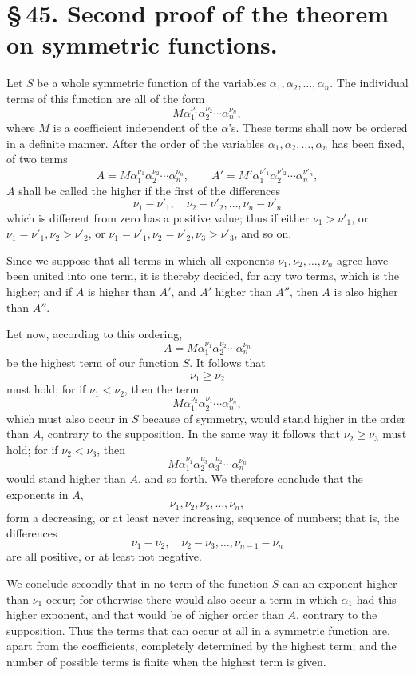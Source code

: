 \documentclass[11pt]{article}
\begin{document}
\section*{\S\,45. Second proof of the theorem on symmetric functions.}

Let \(S\) be a whole symmetric function of the variables \(\alpha_1,\alpha_2,\ldots,\alpha_n\). The individual terms of this function are all of the form
\[
 M\alpha_1^{\nu_1}\alpha_2^{\nu_2}\cdots\alpha_n^{\nu_n},
\]
where \(M\) is a coefficient independent of the \(\alpha\)'s. These terms shall now be ordered in a definite manner. After the order of the variables \(\alpha_1,\alpha_2,\ldots,\alpha_n\) has been fixed, of two terms
\[
 A=M\alpha_1^{\nu_1}\alpha_2^{\nu_2}\cdots\alpha_n^{\nu_n},\qquad
 A'=M'\alpha_1^{\nu'_1}\alpha_2^{\nu'_2}\cdots\alpha_n^{\nu'_n},
\]
\(A\) shall be called the higher if the first of the differences
\[
 \nu_1-\nu'_1,\quad \nu_2-\nu'_2,\ldots,\nu_n-\nu'_n
\]
which is different from zero has a positive value; thus if either \(\nu_1>\nu'_1\), or \(\nu_1=\nu'_1,\nu_2>\nu'_2\), or \(\nu_1=\nu'_1,\nu_2=\nu'_2,\nu_3>\nu'_3\), and so on.

Since we suppose that all terms in which all exponents \(\nu_1,\nu_2,\ldots,\nu_n\) agree have been united into one term, it is thereby decided, for any two terms, which is the higher; and if \(A\) is higher than \(A'\), and \(A'\) higher than \(A''\), then \(A\) is also higher than \(A''\).

Let now, according to this ordering,
\[
 A=M\alpha_1^{\nu_1}\alpha_2^{\nu_2}\cdots\alpha_n^{\nu_n}
\]
be the highest term of our function \(S\). It follows that
\[
 \nu_1\ge \nu_2
\]
must hold; for if \(\nu_1<\nu_2\), then the term
\[
 M\alpha_1^{\nu_2}\alpha_2^{\nu_1}\cdots\alpha_n^{\nu_n},
\]
which must also occur in \(S\) because of symmetry, would stand higher in the order than \(A\), contrary to the supposition. In the same way it follows that \(\nu_2\ge\nu_3\) must hold; for if \(\nu_2<\nu_3\), then
\[
 M\alpha_1^{\nu_1}\alpha_2^{\nu_3}\alpha_3^{\nu_2}\cdots\alpha_n^{\nu_n}
\]
would stand higher than \(A\), and so forth. We therefore conclude that the exponents in \(A\),
\[
 \nu_1,\nu_2,\nu_3,\ldots,\nu_n,
\]
form a decreasing, or at least never increasing, sequence of numbers; that is, the differences
\[
 \nu_1-\nu_2,\quad \nu_2-\nu_3,\ldots,\nu_{n-1}-\nu_n
\]
are all positive, or at least not negative.

We conclude secondly that in no term of the function \(S\) can an exponent higher than \(\nu_1\) occur; for otherwise there would also occur a term in which \(\alpha_1\) had this higher exponent, and that would be of higher order than \(A\), contrary to the supposition. Thus the terms that can occur at all in a symmetric function are, apart from the coefficients, completely determined by the highest term; and the number of possible terms is finite when the highest term is given.
\end{document}

